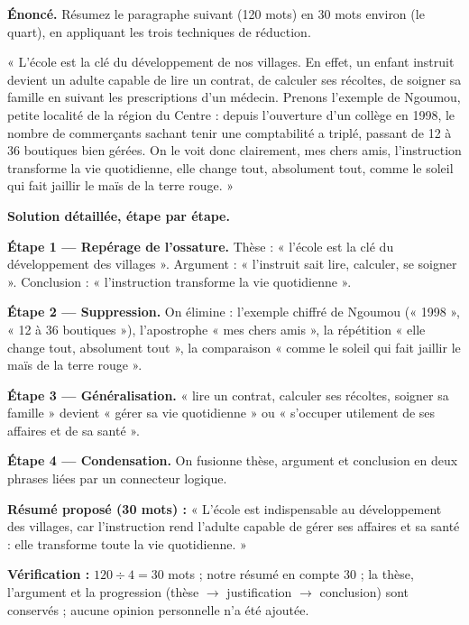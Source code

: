 \documentclass[11pt]{article}
\begin{document}
\begin{exoresolu}
\textbf{Énoncé.} Résumez le paragraphe suivant (120 mots) en 30 mots environ (le quart), en appliquant les trois techniques de réduction.

« L'école est la clé du développement de nos villages. En effet, un enfant instruit devient un adulte capable de lire un contrat, de calculer ses récoltes, de soigner sa famille en suivant les prescriptions d'un médecin. Prenons l'exemple de Ngoumou, petite localité de la région du Centre : depuis l'ouverture d'un collège en 1998, le nombre de commerçants sachant tenir une comptabilité a triplé, passant de 12 à 36 boutiques bien gérées. On le voit donc clairement, mes chers amis, l'instruction transforme la vie quotidienne, elle change tout, absolument tout, comme le soleil qui fait jaillir le maïs de la terre rouge. »

\tcblower
\textbf{Solution détaillée, étape par étape.}

\textbf{Étape 1 — Repérage de l'ossature.} Thèse : « l'école est la clé du développement des villages ». Argument : « l'instruit sait lire, calculer, se soigner ». Conclusion : « l'instruction transforme la vie quotidienne ».

\textbf{Étape 2 — Suppression.} On élimine : l'exemple chiffré de Ngoumou (« 1998 », « 12 à 36 boutiques »), l'apostrophe « mes chers amis », la répétition « elle change tout, absolument tout », la comparaison « comme le soleil qui fait jaillir le maïs de la terre rouge ».

\textbf{Étape 3 — Généralisation.} « lire un contrat, calculer ses récoltes, soigner sa famille » devient « gérer sa vie quotidienne » ou « s'occuper utilement de ses affaires et de sa santé ».

\textbf{Étape 4 — Condensation.} On fusionne thèse, argument et conclusion en deux phrases liées par un connecteur logique.

\textbf{Résumé proposé (30 mots) :} « L'école est indispensable au développement des villages, car l'instruction rend l'adulte capable de gérer ses affaires et sa santé : elle transforme toute la vie quotidienne. »

\textbf{Vérification :} $120 \div 4 = 30$ mots ; notre résumé en compte 30 ; la thèse, l'argument et la progression (thèse $\to$ justification $\to$ conclusion) sont conservés ; aucune opinion personnelle n'a été ajoutée.
\end{exoresolu}
\end{document}
